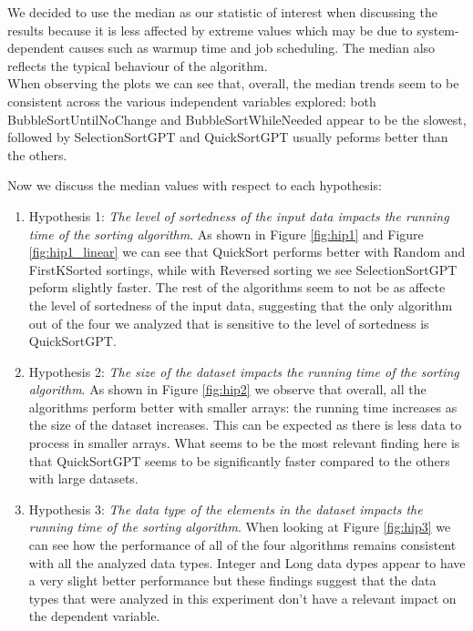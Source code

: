 \documentclass[unicode,11pt,a4paper,oneside,numbers=endperiod,openany]{scrartcl}
\begin{document}
    We decided to use the median as our statistic of interest when discussing the results because it is less affected by extreme values which may be due to system-dependent causes such as warmup time and job scheduling. The median also reflects the typical behaviour of the algorithm. \\

    When observing the plots we can see that, overall, the median trends seem to be consistent across the various independent variables explored: both BubbleSortUntilNoChange and BubbleSortWhileNeeded appear to be the slowest, followed by SelectionSortGPT and QuickSortGPT usually peforms better than the others. 

    Now we discuss the median values with respect to each hypothesis:

    \begin{enumerate}
        \item Hypothesis 1: \textit{ The level of sortedness of the input data impacts the running time of the sorting algorithm}. As shown in Figure \ref{fig:hip1} and Figure \ref{fig:hip1_linear} we can see that QuickSort performs better with Random and FirstKSorted sortings, while with Reversed sorting we see SelectionSortGPT peform slightly faster. The rest of the algorithms seem to not be as affecte the level of sortedness of the input data, suggesting that the only algorithm out of the four we analyzed that is sensitive to the level of sortedness is QuickSortGPT. 

        \item Hypothesis 2: \textit{The size of the dataset impacts the running time of the sorting algorithm}. As shown in Figure \ref{fig:hip2} we observe that overall, all the algorithms perform better with smaller arrays: the running time increases as the size of the dataset increases. This can be expected as there is less data to process in smaller arrays. What seems to be the most relevant finding here is that QuickSortGPT seems to be significantly faster compared to the others with large datasets.

        \item Hypothesis 3: \textit{The data type of the elements in the dataset impacts the running time of the sorting algorithm}. When looking at Figure \ref{fig:hip3} we can see how the performance of all of the four algorithms remains consistent with all the analyzed data types. Integer and Long data dypes appear to have a very slight better performance but these findings suggest that the data types that were analyzed in this experiment don't have a relevant impact on the dependent variable.
    \end{enumerate}
\end{document}
